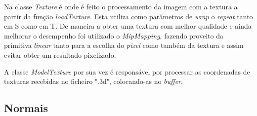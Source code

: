 \documentclass[relatorio.tex]{subfiles}
\begin{document}
Na classe \textit{Texture} é onde é feito o processamento da imagem com a textura
a partir da função \textit{loadTexture}. Esta utiliza como parâmetros de
\textit{wrap} o \textit{repeat} tanto em S como em T. De maneira a obter
uma textura com melhor qualidade e ainda melhorar o desempenho foi utilizado
o \textit{MipMapping}, fazendo proveito da primitiva \textit{linear} tanto para a 
escolha do \textit{pixel} como também da textura e assim evitar obter um resultado pixelizado.

A classe \textit{ModelTexture} por sua vez é responsável por processar as coordenadas de texturas
recebidas no ficheiro ".3d", colocando-as no \textit{buffer}.


\subsection{Normais}
\end{document}
